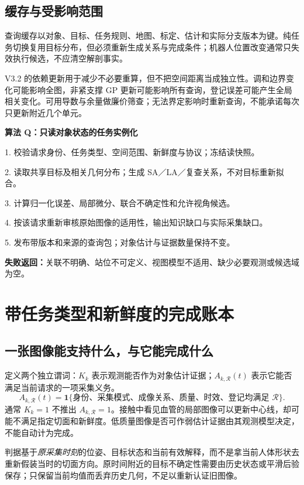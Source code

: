 \documentclass[UTF8,11pt,a4paper,fontset=fandol]{ctexart}
\numberwithin{equation}{section}
\theoremstyle{definition}
\begin{document}
\subsection{缓存与受影响范围}
查询缓存以对象、目标、任务规则、地图、标定、估计和实际分支版本为键。纯任务切换复用目标分布，但必须重新生成关系与完成条件；机器人位置改变通常只失效执行候选，不应清空解剖事实。

V3.2 的依赖更新用于减少不必要重算，但不把空间距离当成独立性。调和边界变化可能影响全图，非紧支撑 GP 更新可能影响所有查询，登记误差可能产生全局相关变化。可用导数与余量做廉价筛查；无法界定影响时重新查询，不能承诺每次只更新附近几个单元。

\begin{keybox}\small
\textbf{算法 Q：只读对象状态的任务实例化}\par
1. 校验请求身份、任务类型、空间范围、新鲜度与协议；冻结读快照。\par
2. 读取共享目标及相关几何分布；生成 SA／LA／复查关系，不对目标重新拟合。\par
3. 计算归一化误差、局部微分、联合不确定性和允许视角候选。\par
4. 按该请求重新审核原始图像的适用性，输出知识缺口与实际采集缺口。\par
5. 发布带版本和来源的查询包；对象估计与证据数量保持不变。\par
\textbf{失败返回：}关联不明确、站位不可定义、视图模型不适用、缺少必要观测或候选域为空。
\end{keybox}

\section{带任务类型和新鲜度的完成账本}
\label{sec:ledger}
\subsection{一张图像能支持什么，与它能完成什么}
定义两个独立谓词：$K_k$ 表示观测能否作为对象估计证据；$A_{k,\mathcal R}(t)$ 表示它能否满足当前请求的一项采集义务。
\begin{equation}
A_{k,\mathcal R}(t)=
\mathbf1\{\text{身份、采集模式、成像关系、质量、时效、登记均满足 }\mathcal R\}.
\label{eq:eligibility}
\end{equation}
通常 $K_k=1$ 不推出 $A_{k,\mathcal R}=1$。接触中看见血管的局部图像可以更新中心线，却可能不满足指定切面和新鲜度。低质量图像是否可作弱估计证据由其观测模型决定，不能自动计为完成。

判据基于\emph{原采集时刻}的位姿、目标状态和当前有效解释，而不是拿当前人体形状去重新假装当时的切面方向。原时间附近的目标不确定性需要由历史状态或平滑后验保存；只保留当前均值而丢弃历史几何，不足以重新认证旧图像。
\end{document}
